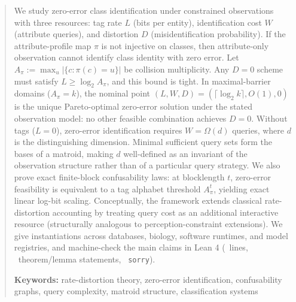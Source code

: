 \begin{abstract}
We study zero-error class identification under constrained observations with three resources: tag rate $L$ (bits per entity), identification cost $W$ (attribute queries), and distortion $D$ (misidentification probability). If the attribute-profile map $\pi$ is not injective on classes, then attribute-only observation cannot identify class identity with zero error. Let $A_\pi := \max_u |\{c : \pi(c)=u\}|$ be collision multiplicity. Any $D=0$ scheme must satisfy $L \ge \log_2 A_\pi$, and this bound is tight. In maximal-barrier domains ($A_\pi=k$), the nominal point $(L,W,D)=(\lceil\log_2 k\rceil,O(1),0)$ is the unique Pareto-optimal zero-error solution under the stated observation model: no other feasible combination achieves $D=0$. Without tags ($L=0$), zero-error identification requires $W=\Omega(d)$ queries, where $d$ is the distinguishing dimension. Minimal sufficient query sets form the bases of a matroid, making $d$ well-defined as an invariant of the observation structure rather than of a particular query strategy. We also prove exact finite-block confusability laws: at blocklength $t$, zero-error feasibility is equivalent to a tag alphabet threshold $A_\pi^t$, yielding exact linear log-bit scaling. Conceptually, the framework extends classical rate-distortion accounting by treating query cost as an additional interactive resource (structurally analogous to perception-constraint extensions). We give instantiations across databases, biology, software runtimes, and model registries, and machine-check the main claims in Lean 4 (\LeanTotalLines\ lines, \LeanTotalTheorems\ theorem/lemma statements, \LeanTotalSorry\ \texttt{sorry}).

\textbf{Keywords:} rate-distortion theory, zero-error identification, confusability graphs, query complexity, matroid structure, classification systems
\end{abstract}
